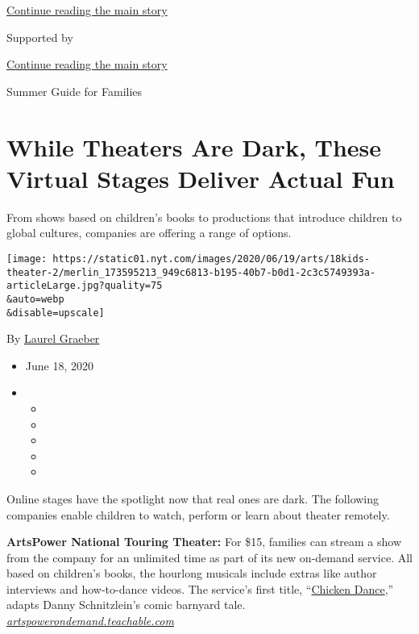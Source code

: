 \protect\hyperlink{after-top}{Continue reading the main story}

Supported by

\protect\hyperlink{after-sponsor}{Continue reading the main story}

Summer Guide for Families

\hypertarget{while-theaters-are-dark-these-virtual-stages-deliver-actual-fun}{%
\section{While Theaters Are Dark, These Virtual Stages Deliver Actual
Fun}\label{while-theaters-are-dark-these-virtual-stages-deliver-actual-fun}}

From shows based on children's books to productions that introduce
children to global cultures, companies are offering a range of options.

\texttt{[image: https://static01.nyt.com/images/2020/06/19/arts/18kids-theater-2/merlin\_173595213\_949c6813-b195-40b7-b0d1-2c3c5749393a-articleLarge.jpg?quality=75\\\&auto=webp\\\&disable=upscale]}

By \href{https://www.nytimes.com/by/laurel-graeber}{Laurel Graeber}

\begin{itemize}
\item
  June 18, 2020
\item
  \begin{itemize}
  \item
  \item
  \item
  \item
  \item
  \end{itemize}
\end{itemize}

Online stages have the spotlight now that real ones are dark. The
following companies enable children to watch, perform or learn about
theater remotely.

\textbf{ArtsPower National Touring Theater:} For \$15, families can
stream a show from the company for an unlimited time as part of its new
on-demand service. All based on children's books, the hourlong musicals
include extras like author interviews and how-to-dance videos. The
service's first title,
``\href{https://artspowerondemand.teachable.com/courses}{Chicken
Dance},'' adapts Danny Schnitzlein's comic barnyard tale.\\
\href{https://artspowerondemand.teachable.com/}{\emph{artspowerondemand.teachable.com}}

